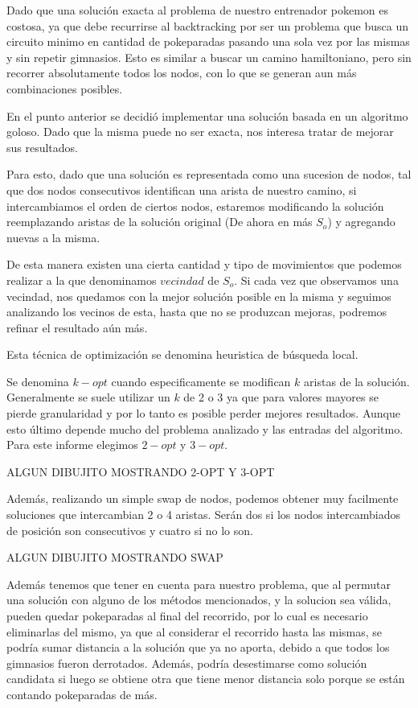 Dado que una solución exacta al problema de nuestro entrenador pokemon es costosa, ya que debe recurrirse al backtracking por ser un problema que busca un circuito minimo en cantidad de pokeparadas pasando una sola vez por las mismas y sin repetir gimnasios. Esto es similar a buscar un camino hamiltoniano, pero sin recorrer absolutamente todos los nodos, con lo que se generan aun más combinaciones posibles.

En el punto anterior se decidió implementar una solución basada en un algoritmo goloso. Dado que la misma puede no ser exacta, nos interesa tratar de mejorar sus resultados. 

Para esto, dado que una solución es representada como una sucesion de nodos, tal que dos nodos consecutivos identifican una arista de nuestro camino, si intercambiamos el orden de ciertos nodos, estaremos modificando la solución reemplazando aristas de la solución original (De ahora en más $S_o$) y agregando nuevas a la misma. 

De esta manera existen una cierta cantidad y tipo de movimientos que podemos realizar a la que denominamos $vecindad$ de $S_o$. 
Si cada vez que observamos una vecindad, nos quedamos con la mejor solución posible en la misma y seguimos analizando los vecinos de esta, hasta que no se produzcan mejoras, podremos refinar el resultado aún más.

Esta técnica de optimización se denomina heuristica de búsqueda local.

Se denomina $k-opt$ cuando especificamente se modifican $k$ aristas de la solución. Generalmente se suele utilizar un $k$ de 2 o 3 ya que para valores mayores se pierde granularidad y por lo tanto es posible perder mejores resultados. Aunque esto último depende mucho del problema analizado y las entradas del algoritmo. Para este informe elegimos $2-opt$ y $3-opt$.

ALGUN DIBUJITO MOSTRANDO 2-OPT Y 3-OPT 

Además, realizando un simple swap de nodos, podemos obtener muy facilmente soluciones que intercambian 2 o 4 aristas. Serán dos si los nodos intercambiados de posición son consecutivos y cuatro si no lo son.

ALGUN DIBUJITO MOSTRANDO SWAP

Además tenemos que tener en cuenta para nuestro problema, que al permutar una solución con alguno de los métodos mencionados, y la solucion sea válida, pueden quedar pokeparadas al final del recorrido, por lo cual es necesario eliminarlas del mismo, ya que al considerar el recorrido hasta las mismas, se podría sumar distancia a la solución que ya no aporta, debido a que todos los gimnasios fueron derrotados. Además, podría desestimarse como solución candidata si luego se obtiene otra que tiene menor distancia solo porque se están contando pokeparadas de más.\\

